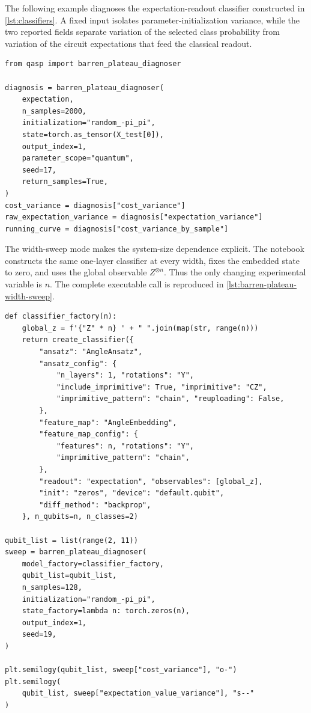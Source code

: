 \documentclass[10pt]{article}
\begin{document}
The following example diagnoses the expectation-readout classifier constructed
in \cref{lst:classifiers}.  A fixed input isolates parameter-initialization
variance, while the two reported fields separate variation of the selected
class probability from variation of the circuit expectations that feed the
classical readout.
\begin{lstlisting}[caption={Cost-level and pre-decoder concentration from the model-agnostic barren-plateau diagnoser.},label={lst:barren-plateau-diagnoser}]
from qasp import barren_plateau_diagnoser

diagnosis = barren_plateau_diagnoser(
    expectation,
    n_samples=2000,
    initialization="random_-pi_pi",
    state=torch.as_tensor(X_test[0]),
    output_index=1,
    parameter_scope="quantum",
    seed=17,
    return_samples=True,
)
cost_variance = diagnosis["cost_variance"]
raw_expectation_variance = diagnosis["expectation_variance"]
running_curve = diagnosis["cost_variance_by_sample"]
\end{lstlisting}

The width-sweep mode makes the system-size dependence explicit.  The notebook
 constructs the
same one-layer classifier at every width, fixes the embedded state to zero, and
uses the global observable $Z^{\otimes n}$.  Thus the only changing experimental
variable is $n$.  The complete executable call is reproduced in
\cref{lst:barren-plateau-width-sweep}.

\begin{lstlisting}[caption={Executable cost-concentration sweep as a function of qubit count.  The notebook uses 128 independent parameter initializations at each width.},label={lst:barren-plateau-width-sweep}]
def classifier_factory(n):
    global_z = f'{"Z" * n} ' + " ".join(map(str, range(n)))
    return create_classifier({
        "ansatz": "AngleAnsatz",
        "ansatz_config": {
            "n_layers": 1, "rotations": "Y",
            "include_imprimitive": True, "imprimitive": "CZ",
            "imprimitive_pattern": "chain", "reuploading": False,
        },
        "feature_map": "AngleEmbedding",
        "feature_map_config": {
            "features": n, "rotations": "Y",
            "imprimitive_pattern": "chain",
        },
        "readout": "expectation", "observables": [global_z],
        "init": "zeros", "device": "default.qubit",
        "diff_method": "backprop",
    }, n_qubits=n, n_classes=2)

qubit_list = list(range(2, 11))
sweep = barren_plateau_diagnoser(
    model_factory=classifier_factory,
    qubit_list=qubit_list,
    n_samples=128,
    initialization="random_-pi_pi",
    state_factory=lambda n: torch.zeros(n),
    output_index=1,
    seed=19,
)

plt.semilogy(qubit_list, sweep["cost_variance"], "o-")
plt.semilogy(
    qubit_list, sweep["expectation_value_variance"], "s--"
)
\end{lstlisting}
\end{document}
